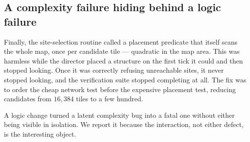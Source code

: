\subsection{A complexity failure hiding behind a logic failure}

Finally, the site-selection routine called a placement predicate that itself
scans the whole map, once per candidate tile --- quadratic in the map area.
This was harmless while the director placed a structure on the first tick it
could and then stopped looking. Once it was correctly refusing unreachable
sites, it never stopped looking, and the verification suite stopped completing
at all. The fix was to order the cheap network test before the expensive
placement test, reducing candidates from $16{,}384$ tiles to a few hundred.

A logic change turned a latent complexity bug into a fatal one without either
being visible in isolation. We report it because the interaction, not either
defect, is the interesting object.
